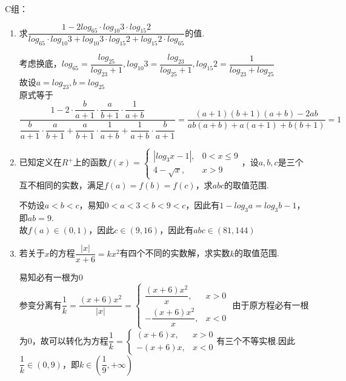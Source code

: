 C组：
\begin{enumerate}
    \item 求$\dfrac{1-2log_65 \cdot log_{10}3 \cdot log_{15}2}{log_65 \cdot log_{10}3 + log_{10}3 \cdot log_{15}2 + log_{15}2 \cdot log_65}$的值.
    \begin{jieda}
        考虑换底，$log_65 = \dfrac{log_25}{log_23+1}, log_{10}3 = \dfrac{log_23}{log_25+1}, log_{15}2 = \dfrac{1}{log_23 + log_25}$\\
        故设$a = log_23, b = log_25$\\
        原式等于$\dfrac{1 - 2 \cdot \dfrac{b}{a+1} \cdot \dfrac{a}{b+1} \cdot \dfrac{1}{a+b}}{\dfrac{b}{a+1}\cdot \dfrac{a}{b+1} + \dfrac{a}{b+1} \cdot \dfrac{1}{a+b} + \dfrac{1}{a+b} \cdot \dfrac{b}{a+1}} = \dfrac{\left(a+1\right)\left(b+1\right)\left(a+b\right) - 2ab}{ab\left(a+b\right) + a\left(a+1\right) + b\left(b+1\right)} = 1$
    \end{jieda}
    \item 已知定义在$R^{+}$上的函数$f\left(x\right) = \left \{\begin{array}{ll}
        |log_3x - 1|, & 0 < x \leq 9 \\
        4-\sqrt{x}, & x > 9
    \end{array} \right.$，设$a, b, c$是三个互不相同的实数，满足$f\left(a\right) = f\left(b\right) = f\left(c\right)$，求$abc$的取值范围.
    \begin{jieda}
        不妨设$a < b < c$，易知$0 < a < 3 < b < 9< c$，因此有$1 - log_3a = log_3b - 1$，即$ab = 9$. \\
        故$f\left(a\right) \in \left(0, 1\right)$，因此$c \in \left(9, 16\right)$，因此有$abc \in \left(81, 144\right)$
    \end{jieda}
    \item 若关于$x$的方程$\dfrac{|x|}{x+6} = kx^2$有四个不同的实数解，求实数$k$的取值范围.
    \begin{jieda}
        易知必有一根为0 \\
        参变分离有$\dfrac{1}{k} = \dfrac{\left(x+6\right)x^2}{|x|} = \left \{ \begin{array}{ll}
            \dfrac{\left(x+6\right)x^2}{x}, & x > 0 \\
            -\dfrac{\left(x+6\right)x^2}{x},  & x < 0
        \end{array}\right.$
        由于原方程必有一根为0，故可以转化为方程$\dfrac{1}{k} = \left \{ \begin{array}{ll}
            \left(x+6\right)x, & x > 0 \\
            -\left(x+6\right)x,  & x < 0
        \end{array}\right.$有三个不等实根.因此$\dfrac{1}{k} \in \left(0, 9\right)$，即$k \in \left(\dfrac{1}{9}, +\infty\right)$
    \end{jieda}
\end{enumerate}

